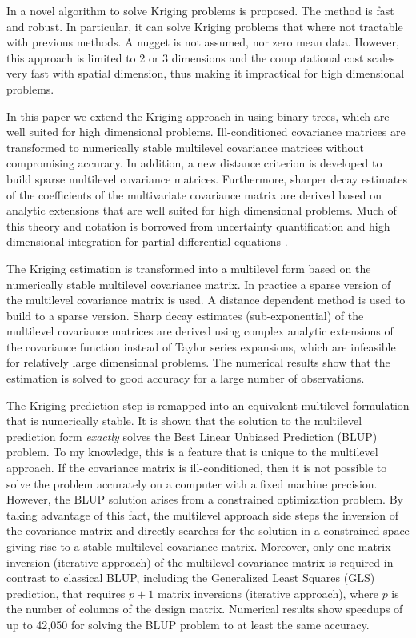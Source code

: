 \documentclass[11pt,final]{amsart}       %
\begin{document}
In \cite{Castrillon2015} a novel algorithm to solve Kriging problems
is proposed. The method is fast and robust. In particular, it can
solve Kriging problems that where not tractable with previous
methods. A nugget is not assumed, nor zero mean data.  However, this
approach is limited to 2 or 3 dimensions and the computational cost
scales very fast with spatial dimension, thus making it impractical
for high dimensional problems.

In this paper we extend the Kriging approach in \cite{Castrillon2015}
using binary trees, which are well suited for high dimensional
problems. Ill-conditioned covariance matrices are transformed to
numerically stable multilevel covariance matrices without compromising
accuracy. In addition, a new distance criterion is developed to build
sparse multilevel covariance matrices.  Furthermore, sharper decay
estimates of the coefficients of the multivariate covariance matrix
are derived based on analytic extensions that are well suited for high
dimensional problems. Much of this theory and notation is borrowed
from uncertainty quantification and high dimensional integration for
partial differential equations
\cite{nobile2008a,Castrillon2016,Griebel2016}.

The Kriging estimation is transformed into a multilevel form based on
the numerically stable multilevel covariance matrix. In practice a
sparse version of the multilevel covariance matrix is used. A distance
dependent method is used to build to a sparse version. Sharp decay
estimates (sub-exponential) of the multilevel covariance matrices are
derived using complex analytic extensions of the covariance function
instead of Taylor series expansions, which are infeasible for
relatively large dimensional problems. The numerical results show that
the estimation is solved to good accuracy for a large number of
observations.

The Kriging prediction step is remapped into an equivalent multilevel
formulation that is numerically stable. It is shown that the solution
to the multilevel prediction form \emph{exactly} solves the Best
Linear Unbiased Prediction (BLUP) problem.  To my knowledge, this is a
feature that is unique to the multilevel approach.  If the covariance
matrix is ill-conditioned, then it is not possible to solve the
problem accurately on a computer with a fixed machine
precision. However, the BLUP solution arises from a constrained
optimization problem. By taking advantage of this fact, the multilevel
approach side steps the inversion of the covariance matrix and
directly searches for the solution in a constrained space giving rise
to a stable multilevel covariance matrix.  Moreover, only one matrix
inversion (iterative approach) of the multilevel covariance matrix is
required in contrast to classical BLUP, including the Generalized
Least Squares (GLS) prediction, that requires $p+1$ matrix inversions
(iterative approach), where $p$ is the number of columns of the design
matrix.  Numerical results show speedups of up to 42,050 for solving
the BLUP problem to at least the same accuracy.
\end{document}
